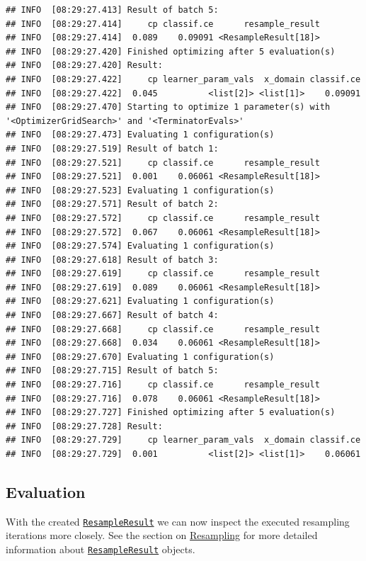 \documentclass[]{scrbook}
\begin{document}
\begin{verbatim}
## INFO  [08:29:27.413] Result of batch 5: 
## INFO  [08:29:27.414]     cp classif.ce      resample_result 
## INFO  [08:29:27.414]  0.089    0.09091 <ResampleResult[18]> 
## INFO  [08:29:27.420] Finished optimizing after 5 evaluation(s) 
## INFO  [08:29:27.420] Result: 
## INFO  [08:29:27.422]     cp learner_param_vals  x_domain classif.ce 
## INFO  [08:29:27.422]  0.045          <list[2]> <list[1]>    0.09091 
## INFO  [08:29:27.470] Starting to optimize 1 parameter(s) with '<OptimizerGridSearch>' and '<TerminatorEvals>' 
## INFO  [08:29:27.473] Evaluating 1 configuration(s) 
## INFO  [08:29:27.519] Result of batch 1: 
## INFO  [08:29:27.521]     cp classif.ce      resample_result 
## INFO  [08:29:27.521]  0.001    0.06061 <ResampleResult[18]> 
## INFO  [08:29:27.523] Evaluating 1 configuration(s) 
## INFO  [08:29:27.571] Result of batch 2: 
## INFO  [08:29:27.572]     cp classif.ce      resample_result 
## INFO  [08:29:27.572]  0.067    0.06061 <ResampleResult[18]> 
## INFO  [08:29:27.574] Evaluating 1 configuration(s) 
## INFO  [08:29:27.618] Result of batch 3: 
## INFO  [08:29:27.619]     cp classif.ce      resample_result 
## INFO  [08:29:27.619]  0.089    0.06061 <ResampleResult[18]> 
## INFO  [08:29:27.621] Evaluating 1 configuration(s) 
## INFO  [08:29:27.667] Result of batch 4: 
## INFO  [08:29:27.668]     cp classif.ce      resample_result 
## INFO  [08:29:27.668]  0.034    0.06061 <ResampleResult[18]> 
## INFO  [08:29:27.670] Evaluating 1 configuration(s) 
## INFO  [08:29:27.715] Result of batch 5: 
## INFO  [08:29:27.716]     cp classif.ce      resample_result 
## INFO  [08:29:27.716]  0.078    0.06061 <ResampleResult[18]> 
## INFO  [08:29:27.727] Finished optimizing after 5 evaluation(s) 
## INFO  [08:29:27.728] Result: 
## INFO  [08:29:27.729]     cp learner_param_vals  x_domain classif.ce 
## INFO  [08:29:27.729]  0.001          <list[2]> <list[1]>    0.06061
\end{verbatim}

\hypertarget{nested-resamp-eval}{%
\subsection{Evaluation}\label{nested-resamp-eval}}

With the created \href{https://mlr3.mlr-org.com/reference/ResampleResult.html}{\texttt{ResampleResult}} we can now inspect the executed resampling iterations more closely.
See the section on \protect\hyperlink{resampling}{Resampling} for more detailed information about \href{https://mlr3.mlr-org.com/reference/ResampleResult.html}{\texttt{ResampleResult}} objects.
\end{document}
